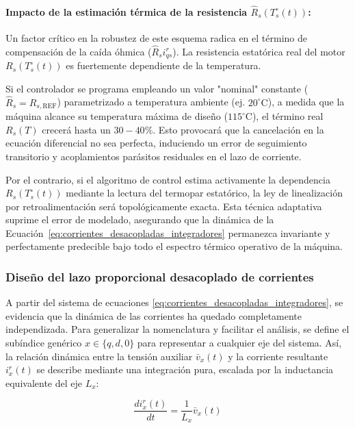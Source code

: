 \documentclass[10pt,a4paper]{article}
\begin{document}
\paragraph{Impacto de la estimación térmica de la resistencia $\hat{R}_s(T_s^\circ(t))$:}
Un factor crítico en la robustez de este esquema radica en el término de compensación de la caída óhmica ($\hat{R}_s i_{qs}^r$). La resistencia estatórica real del motor $R_s(T_s^\circ(t))$ es fuertemente dependiente de la temperatura. 

Si el controlador se programa empleando un valor "nominal" constante ($\hat{R}_s = R_{s,\mathrm{REF}}$) parametrizado a temperatura ambiente (ej. $20^\circ\text{C}$), a medida que la máquina alcance su temperatura máxima de diseño ($115^\circ\text{C}$), el término real $R_s(T)$ crecerá hasta un $30-40\%$. Esto provocará que la cancelación en la ecuación diferencial no sea perfecta, induciendo un error de seguimiento transitorio y acoplamientos parásitos residuales en el lazo de corriente.

Por el contrario, si el algoritmo de control estima activamente la dependencia $R_s(T_s^\circ(t))$ mediante la lectura del termopar estatórico, la ley de linealización por retroalimentación será topológicamente exacta. Esta técnica adaptativa suprime el error de modelado, asegurando que la dinámica de la Ecuación~\eqref{eq:corrientes_desacopladas_integradores} permanezca invariante y perfectamente predecible bajo todo el espectro térmico operativo de la máquina.

\subsubsection{Diseño del lazo proporcional desacoplado de corrientes}

A partir del sistema de ecuaciones \eqref{eq:corrientes_desacopladas_integradores}, se evidencia que la dinámica de las corrientes ha quedado completamente independizada. Para generalizar la nomenclatura y facilitar el análisis, se define el subíndice genérico $x \in \{q, d, 0\}$ para representar a cualquier eje del sistema. Así, la relación dinámica entre la tensión auxiliar $\bar{v}_x(t)$ y la corriente resultante $i_x^r(t)$ se describe mediante una integración pura, escalada por la inductancia equivalente del eje $L_x$:

\begin{equation}
    \frac{di_x^r(t)}{dt} = \frac{1}{L_x} \bar{v}_x(t)
\end{equation}
\end{document}
